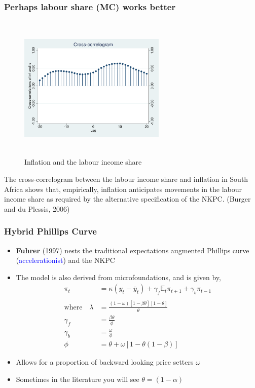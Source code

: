 \documentclass[10pt, xcolor=x11names, table]{beamer}
\begin{document}
\begin{frame}
\frametitle{Perhaps labour share (MC) works better}
\begin{figure}
\centering
\includegraphics[width=7cm, height=7cm, keepaspectratio]{images/xcorr1}
\caption{Inflation and the labour income share}
\end{figure}
{\footnotesize{The cross-correlogram between the labour income share and inflation in South Africa shows that, empirically, inflation anticipates movements in the labour income share as required by the alternative specification of the NKPC. (Burger and du Plessis, 2006)}}
\end{frame}


\begin{frame}
\frametitle{Hybrid Phillips Curve}
\small
\begin{itemize}
  \item \textbf{Fuhrer} (1997) nests the traditional expectations augmented Phillips curve (\textcolor{blue}{accelerationist}) and the NKPC
  \item The model is also derived from microfoundations, and is given by,
\begin{align*}
\pi_{t} &= \kappa({y_{t} - \bar{y}_{t}}) + \gamma_{f}\mathbb{E}_{t}\pi_{t+1} + \gamma_{b}\pi_{t-1} \\~\\
\text{where} \quad\lambda &= \frac{(1-\omega)[1-\beta\theta][1-\theta ]}{\theta } \\
\gamma_{f} &= \frac{\beta\theta}{\phi} \\
\gamma_{b} &= \frac{\omega}{\phi} \\
\phi &= \theta + \omega[1-\theta(1-\beta)]
\end{align*}
\item Allows for a proportion of backward looking price setters $\omega$
\item Sometimes in the literature you will see $\theta = (1-\alpha)$
\end{itemize}
\end{frame}
\end{document}
